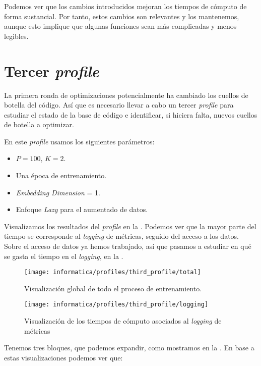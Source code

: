 Podemos ver que los cambios introducidos mejoran los tiempos de cómputo de forma sustancial. Por tanto, estos cambios son relevantes y los mantenemos, aunque esto implique que algunas funciones sean más complicadas y menos legibles.

\section{Tercer \textit{profile}}

La primera ronda de optimizaciones potencialmente ha cambiado los cuellos de botella del código. Así que es necesario llevar a cabo un tercer \textit{profile} para estudiar el estado de la base de código e identificar, si hiciera falta, nuevos cuellos de botella a optimizar.

En este \textit{profile} usamos los siguientes parámetros:

\begin{itemize}
	\item $P = 100$, $K = 2$.
	\item Una época de entrenamiento.
	\item \textit{Embedding Dimension} = 1.
	\item Enfoque \textit{Lazy} para el aumentado de datos.
\end{itemize}

Visualizamos los resultados del \textit{profile} en la . Podemos ver que la mayor parte del tiempo se corresponde al \textit{logging} de métricas, seguido del acceso a los datos. Sobre el acceso de datos ya hemos trabajado, así que pasamos a estudiar en qué se gasta el tiempo en el \textit{logging}, en la .

\begin{figure}[!hbtp]
	\centering
	\texttt{[image: informatica/profiles/third\_profile/total]}
	\caption{Visualización global de todo el proceso de entrenamiento.}
	\label{img:optimizacion_04}
\end{figure}

\begin{figure}[!hbtp]
	\centering
	\texttt{[image: informatica/profiles/third\_profile/logging]}
	\caption{Visualización de los tiempos de cómputo asociados al \textit{logging} de métricas}
	\label{table:optimizacion_02}
\end{figure}

Tenemos tres bloques, que podemos expandir, como mostramos en la . En base a estas visualizaciones podemos ver que:

